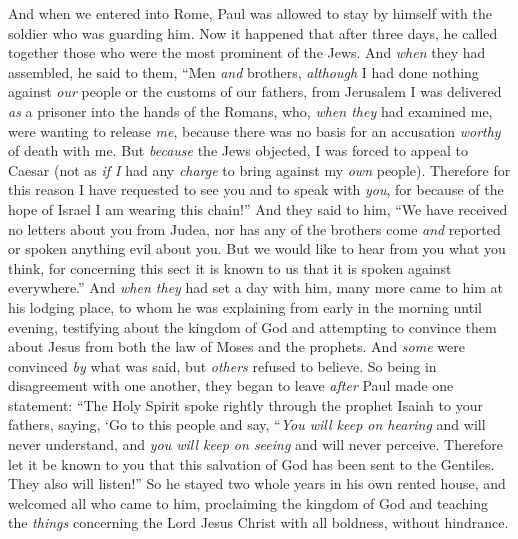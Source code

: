 \begin{biblechapter}
\verse And when we entered into Rome, Paul was allowed to stay by himself with the soldier who was guarding him.
 Now it happened that after three days, he called together those who were the most prominent of the Jews. And \textit{when} they had assembled, he said to them, “Men \textit{and} brothers, \textit{although} I had done nothing against \textit{our} people or the customs of our fathers, from Jerusalem I was delivered \textit{as} a prisoner into the hands of the Romans,
\verse who, \textit{when they} had examined me, were wanting to release \textit{me}, because there was no basis for an accusation \textit{worthy} of death with me.
\verse But \textit{because} the Jews objected, I was forced to appeal to Caesar (not as \textit{if I} had any \textit{charge} to bring against my \textit{own} people).
\verse Therefore for this reason I have requested to see you and to speak with \textit{you}, for because of the hope of Israel I am wearing this chain!”
\verse And they said to him, “We have received no letters about you from Judea, nor has any of the brothers come \textit{and} reported or spoken anything evil about you.
\verse But we would like to hear from you what you think, for concerning this sect it is known to us that it is spoken against everywhere.”
\verse And \textit{when they} had set a day with him, many more came to him at his lodging place, to whom he was explaining from early in the morning until evening, testifying about the kingdom of God and attempting to convince them about Jesus from both the law of Moses and the prophets.
\verse And \textit{some} were convinced \textit{by} what was said, but \textit{others} refused to believe.
\verse So being in disagreement with one another, they began to leave \textit{after} Paul made one statement: “The Holy Spirit spoke rightly through the prophet Isaiah to your fathers,
\verse saying,
\verse ‘Go to this people and say, 
“\textit{You will keep on hearing} and will never understand, 
and \textit{you will keep on seeing} and will never perceive.
\verse Therefore let it be known to you that this salvation of God has been sent to the Gentiles. They also will listen!”
\verse So he stayed two whole years in his own rented house, and welcomed all who came to him,
\verse proclaiming the kingdom of God and teaching the \textit{things} concerning the Lord Jesus Christ with all boldness, without hindrance.
\end{biblechapter}

